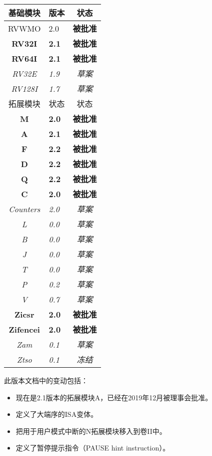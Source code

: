 {
\begin{table}[hbt]
  \centering
  \begin{tabular}{|c|l|c|}
    \hline
    基础模块        & 版本   & 状态\\
    \hline
    RVWMO          & 2.0 & \bf 被批准   \\
    \bf RV32I      & \bf 2.1 & \bf 被批准 \\
    \bf RV64I      & \bf 2.1 & \bf 被批准 \\
    \em RV32E      & \em 1.9 & \em 草案 \\
    \em RV128I     & \em 1.7 & \em 草案 \\
    \hline
    拓展模块      & 状态 & 状态 \\
    \hline
    \bf M          & \bf 2.0 & \bf 被批准 \\
    \bf A          & \bf 2.1 & \bf 被批准 \\
    \bf F          & \bf 2.2 & \bf 被批准 \\
    \bf D          & \bf 2.2 & \bf 被批准 \\
    \bf Q          & \bf 2.2 & \bf 被批准 \\
    \bf C          & \bf 2.0 & \bf 被批准 \\
    \em Counters   & \em 2.0 & \em 草案 \\
    \em L          & \em 0.0 & \em 草案 \\
    \em B          & \em 0.0 & \em 草案 \\
    \em J          & \em 0.0 & \em 草案 \\
    \em T          & \em 0.0 & \em 草案 \\
    \em P          & \em 0.2 & \em 草案 \\
    \em V          & \em 0.7 & \em 草案 \\
    \bf Zicsr      & \bf 2.0 & \bf 被批准 \\
    \bf Zifencei   & \bf 2.0 & \bf 被批准 \\
    \em Zam        & \em 0.1 & \em 草案 \\
    \em Ztso       & \em 0.1 & \em 冻结 \\
    \hline
  \end{tabular}
\end{table}
}

此版本文档中的变动包括：
\vspace{-0.2in}
\begin{itemize}
\parskip 0pt
\itemsep 1pt
\item 现在是2.1版本的拓展模块A，已经在2019年12月被理事会批准。
\item 定义了大端序的ISA变体。
\item 把用于用户模式中断的N拓展模块移入到卷II中。
\item 定义了暂停提示指令（PAUSE hint instruction）。
\end{itemize}

